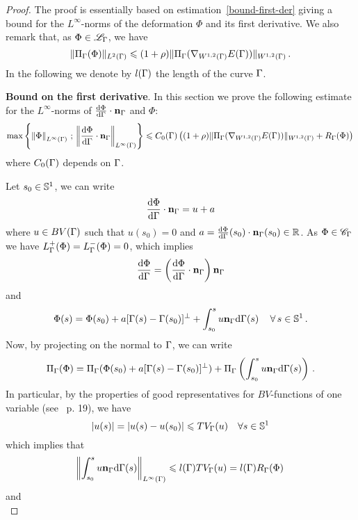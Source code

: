 \begin{proof} 
The proof is essentially based on   estimation~\eqref{bound-first-der} giving a bound for the $L^\infty$-norms of the deformation $\Phi$ and its first derivative. We also remark that, as $\Phi\in \mathcal{L}_\Gamma$, we have
\begin{equation}\label{l1-bound}
\|  \Pi_\Gamma(\Phi)  \|_{
L^{2}(\Gamma)} \leqslant (1+\rho)\|\Pi_\Gamma(\nabla_{W^{1,2}(\Gamma)}E(\Gamma))\|_{W^{1,2}(\Gamma)}\,.
\end{equation}
In the following we denote by $l(\Gamma)$ the length of the curve $\Gamma$. 

{\bf Bound on the first derivative}. In this section  we prove the following   estimate for the $L^\infty$-norms of  $\frac{\mathrm{d}\Phi}{\mathrm{d}\Gamma}\cdot \mathbf{n}_\Gamma $ and $\Phi$:
\begin{equation}\label{bound-first-der}
	\mbox{max}\left\{
		\left\|\Phi\right\|_{L^{\infty}(\Gamma)}\,;\,
		\left\|\frac{\mathrm{d} \Phi}{\mathrm{d}\Gamma}\cdot\mathbf{n}_\Gamma\right\|_{L^{\infty}(\Gamma)}
	\right\}
	\leqslant C_0(\Gamma)\left((1+\rho)\|\Pi_\Gamma(\nabla_{W^{1,2}(\Gamma)}E(\Gamma))\|_{W^{1,2}(\Gamma)}+ R_\Gamma(\Phi)\right)\,
\end{equation}
where $C_0(\Gamma)$ depends on  $\Gamma$. 
\par  Let $s_0\in \mathbb{S}^1$, we can write
$$\frac{\mathrm{d}\Phi}{\mathrm{d}\Gamma}\cdot \mathbf{n}_\Gamma = u + a$$
where $u\in BV(\Gamma)$ such that $u(s_0)=0$  and $a=\frac{\mathrm{d}\Phi}{\mathrm{d}\Gamma}(s_0)\cdot \mathbf{n}_\Gamma(s_0)\in {\mathbb R}$. As $\Phi\in\mathcal{C}_\Gamma$ we have $L_\Gamma^+(\Phi)=L_\Gamma^-(\Phi)=0$, which implies
$$\frac{\mathrm{d}\Phi}{\mathrm{d}\Gamma}=\left(\frac{\mathrm{d}\Phi}{\mathrm{d}\Gamma}\cdot \mathbf{n}_\Gamma\right)\mathbf{n}_\Gamma$$
and
\begin{equation}\label{writing-phi}
\Phi(s)= \Phi(s_0) + a[\Gamma(s)-\Gamma(s_0)]^\bot+ \int_{s_0}^s u\mathbf{n}_\Gamma \mathrm{d} \Gamma(s) \,\quad \forall \, s\in \mathbb{S}^1\,.
\end{equation}
Now, by projecting on the normal to $\Gamma$, we can write 
\begin{equation}\label{decomp-xi}\Pi_\Gamma(\Phi)=\Pi_\Gamma(\Phi(s_0)+ a[\Gamma(s)-\Gamma(s_0)]^\bot)+\Pi_\Gamma\left(\int_{s_0}^s u\mathbf{n}_\Gamma \mathrm{d} \Gamma(s)\right)\,.
\end{equation}
In particular, by the properties of good representatives for  $BV$-functions of one variable (see~\cite{AFP} p. 19), we have 
$$
|u(s)|=|u(s)-u(s_0)|\leqslant TV_\Gamma(u)\quad \forall s\in \mathbb{S}^1
$$
which implies that
\begin{equation}\label{first-bv0}
\left\|\int_{s_0}^s u\mathbf{n}_\Gamma \mathrm{d} \Gamma(s)\right\|_{L^\infty(\Gamma)}\leqslant
l(\Gamma) TV_\Gamma(u)= l(\Gamma) R_\Gamma(\Phi)\,
 \end{equation}
 and
 \begin{equation}\label{first-bv0-l2}

\end{equation}
\end{proof}
